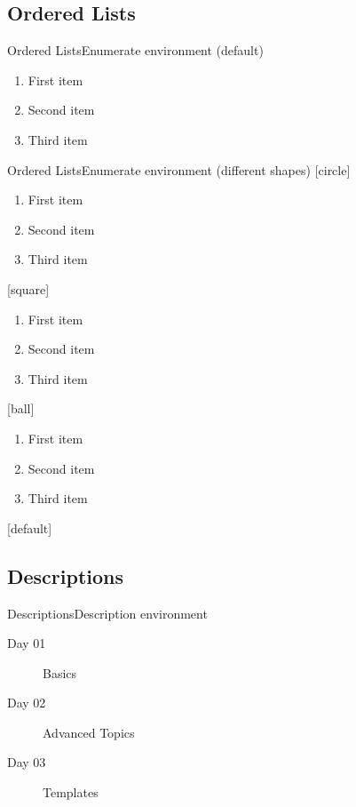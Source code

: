 \documentclass{beamer}
\begin{document}
\subsection{Ordered Lists}

\begin{frame}{Ordered Lists}{Enumerate environment (default)}
\begin{enumerate}
    \item First item
    \item Second item
    \item Third item
\end{enumerate}
\end{frame}

\begin{frame}{Ordered Lists}{Enumerate environment (different shapes)}
[circle]
\begin{enumerate}
    \item First item
    \item Second item
    \item Third item
\end{enumerate}

[square]
\begin{enumerate}
    \item First item
    \item Second item
    \item Third item
\end{enumerate}

[ball]
\begin{enumerate}
    \item First item
    \item Second item
    \item Third item
\end{enumerate}

[default] %

\end{frame}

\subsection{Descriptions}

\begin{frame}{Descriptions}{Description environment}

\begin{description}
    \item[Day 01] Basics
    \item[Day 02] Advanced Topics
    \item[Day 03] Templates
\end{description}

\end{frame}
\end{document}
